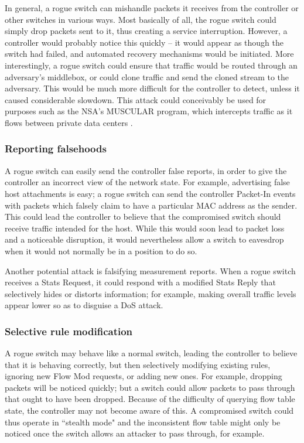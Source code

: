 In general, a rogue switch can mishandle packets it receives from the controller or other switches in various ways. Most basically of all, the rogue switch could simply drop packets sent to it, thus creating a service interruption. However, a controller would probably notice this quickly -- it would appear as though the switch had failed, and automated recovery mechanisms would be initiated. More interestingly, a rogue switch could ensure that traffic would be routed through an adversary's middlebox, or could clone traffic and send the cloned stream to the adversary. This would be much more difficult for the controller to detect, unless it caused considerable slowdown. This attack could conceivably be used for purposes such as the NSA's MUSCULAR program, which intercepts traffic as it flows between private data centers \cite{muscular}. 

\subsubsection{Reporting falsehoods}

A rogue switch can easily send the controller false reports, in order to give the controller an incorrect view of the network state. For example, advertising false host attachments is easy; a rogue switch can send the controller Packet-In events with packets which falsely claim to have a particular MAC address as the sender. This could lead the controller to believe that the compromised switch should receive traffic intended for the host. While this would soon lead to packet loss and a noticeable disruption, it would nevertheless allow a switch to eavesdrop when it would not normally be in a position to do so.

Another potential attack is falsifying measurement reports. When a rogue switch receives a Stats Request, it could respond with a modified Stats Reply that selectively hides or distorts information; for example, making overall traffic levels appear lower so as to disguise a DoS attack. 

\subsubsection{Selective rule modification}
A rogue switch may behave like a normal switch, leading the controller to believe that it is behaving correctly, but then selectively modifying existing rules, ignoring new Flow Mod requests, or adding new ones. For example, dropping packets will be noticed quickly; but a switch could allow packets to pass through that ought to have been dropped. Because of the difficulty of querying flow table state, the controller may not become aware of this. A compromised switch could thus operate in ``stealth mode" and the inconsistent flow table might only be noticed once the switch allows an attacker to pass through, for example.

